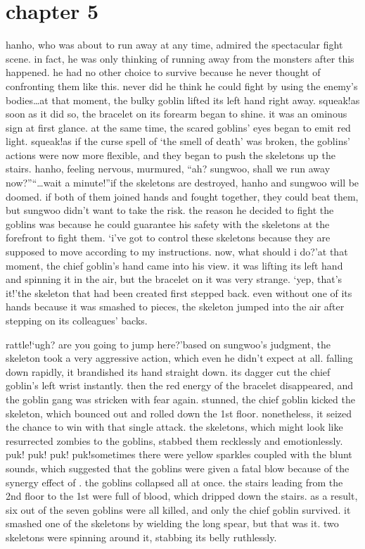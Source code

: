 \section{chapter 5}






hanho, who was about to run away at any time, admired the spectacular fight scene.
in fact, he was only thinking of running away from the monsters after this happened.
 he had no other choice to survive because he never thought of confronting them like this.
 never did he think he could fight by using the enemy’s bodies…at that moment, the bulky goblin lifted its left hand right away.
squeak!as soon as it did so, the bracelet on its forearm began to shine.
 it was an ominous sign at first glance.
at the same time, the scared goblins’ eyes began to emit red light.
squeak!as if the curse spell of ‘the smell of death’ was broken, the goblins’ actions were now more flexible, and they began to push the skeletons up the stairs.
hanho, feeling nervous, murmured, “ah? sungwoo, shall we run away now?”“…wait a minute!”if the skeletons are destroyed, hanho and sungwoo will be doomed.
 if both of them joined hands and fought together, they could beat them, but sungwoo didn’t want to take the risk.
the reason he decided to fight the goblins was because he could guarantee his safety with the skeletons at the forefront to fight them.
‘i’ve got to control these skeletons because they are supposed to move according to my instructions.
 now, what should i do?’at that moment, the chief goblin’s hand came into his view.
 it was lifting its left hand and spinning it in the air, but the bracelet on it was very strange.
‘yep, that’s it!’the skeleton that had been created first stepped back.
 even without one of its hands because it was smashed to pieces, the skeleton jumped into the air after stepping on its colleagues’ backs.

rattle!‘ugh? are you going to jump here?’based on sungwoo’s judgment, the skeleton took a very aggressive action, which even he didn’t expect at all.
 falling down rapidly, it brandished its hand straight down.
its dagger cut the chief goblin’s left wrist instantly.
 then the red energy of the bracelet disappeared, and the goblin gang was stricken with fear again.
stunned, the chief goblin kicked the skeleton, which bounced out and rolled down the 1st floor.
nonetheless, it seized the chance to win with that single attack.
the skeletons, which might look like resurrected zombies to the goblins, stabbed them recklessly and emotionlessly.
puk! puk! puk! puk!sometimes there were yellow sparkles coupled with the blunt sounds, which suggested that the goblins were given a fatal blow because of the synergy effect of .
the goblins collapsed all at once.
 the stairs leading from the 2nd floor to the 1st were full of blood, which dripped down the stairs.
as a result, six out of the seven goblins were all killed, and only the chief goblin survived.
it smashed one of the skeletons by wielding the long spear, but that was it.
two skeletons were spinning around it, stabbing its belly ruthlessly.

